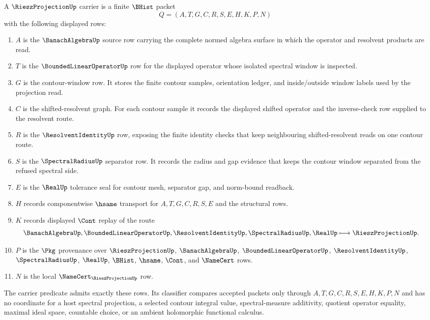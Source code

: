 \begin{definition}
\label{def:riesz-projection-carrier}
A $\RieszProjectionUp$ carrier is a finite $\BHist$ packet
$$
Q=(A,T,G,C,R,S,E,H,K,P,N)
$$
with the following displayed rows:
\begin{enumerate}
\item $A$ is the $\BanachAlgebraUp$ source row carrying the complete normed algebra surface in which the operator and resolvent products are read.
\item $T$ is the $\BoundedLinearOperatorUp$ row for the displayed operator whose isolated spectral window is inspected.
\item $G$ is the contour-window row. It stores the finite contour samples, orientation ledger, and inside/outside window labels used by the projection read.
\item $C$ is the shifted-resolvent graph. For each contour sample it records the displayed shifted operator and the inverse-check row supplied to the resolvent route.
\item $R$ is the $\ResolventIdentityUp$ row, exposing the finite identity checks that keep neighbouring shifted-resolvent reads on one contour route.
\item $S$ is the $\SpectralRadiusUp$ separator row. It records the radius and gap evidence that keeps the contour window separated from the refused spectral side.
\item $E$ is the $\RealUp$ tolerance seal for contour mesh, separator gap, and norm-bound readback.
\item $H$ records componentwise $\hsame$ transport for $A,T,G,C,R,S,E$ and the structural rows.
\item $K$ records displayed $\Cont$ replay of the route
$$
\BanachAlgebraUp,\BoundedLinearOperatorUp,\ResolventIdentityUp,\SpectralRadiusUp,\RealUp
\longmapsto \RieszProjectionUp .
$$
\item $P$ is the $\Pkg$ provenance over $\RieszProjectionUp$, $\BanachAlgebraUp$, $\BoundedLinearOperatorUp$, $\ResolventIdentityUp$, $\SpectralRadiusUp$, $\RealUp$, $\BHist$, $\hsame$, $\Cont$, and $\NameCert$ rows.
\item $N$ is the local $\NameCert_{\RieszProjectionUp}$ row.
\end{enumerate}
The carrier predicate admits exactly these rows. Its classifier compares accepted packets only through $A,T,G,C,R,S,E,H,K,P,N$ and has no coordinate for a host spectral projection, a selected contour integral value, spectral-measure additivity, quotient operator equality, maximal ideal space, countable choice, or an ambient holomorphic functional calculus.
\end{definition}

